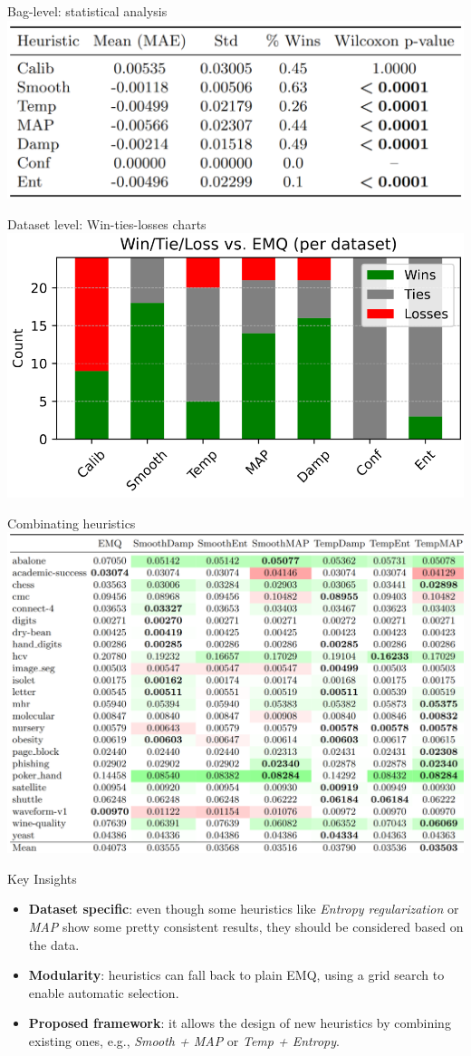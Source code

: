 \documentclass[aspectratio=169]{beamer}
\begin{document}
\begin{frame}{Bag-level: statistical analysis}
  \centering
  \includegraphics[width=0.6\linewidth]{images/statistical_analysis.png}
\end{frame}

\begin{frame}{Dataset level: Win-ties-losses charts}
  \centering
    \includegraphics[width=0.6\linewidth]{images/datasetlevel.png}
\end{frame}

\begin{frame}{Combinating heuristics}
  \centering
    \includegraphics[width=0.6\linewidth]{images/combinations.png}
\end{frame}

\begin{frame}{Key Insights}
  \begin{itemize}
    \item \textbf{Dataset specific}: even though some heuristics like \textit{Entropy regularization} or \textit{MAP} show some pretty consistent results, they should be considered based on the data.
    \item \textbf{Modularity}: heuristics can fall back to plain EMQ, using a grid search to enable automatic selection.
    \item \textbf{Proposed framework}: it allows the design of new heuristics by combining existing ones, e.g., \textit{Smooth + MAP} or \textit{Temp + Entropy}.
  \end{itemize}
\end{frame}
\end{document}
